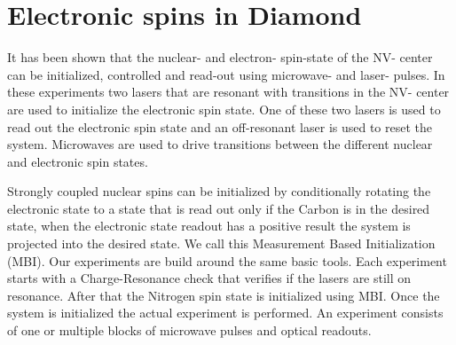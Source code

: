 \chapter{Electronic spins in Diamond}
\label{controlingspinsindiamond}




It has been shown that the nuclear- and electron- spin-state of the NV- center can be initialized, controlled and read-out using microwave- and laser- pulses\citep{Robledo2011HighFidelity}. In these experiments two lasers that are resonant with transitions in the NV- center are used to initialize the electronic spin state.
One of these two lasers is used to read out the electronic spin state and an off-resonant laser is used to reset the system. Microwaves are used to drive transitions between the different nuclear and electronic spin states.

Strongly coupled nuclear spins can be initialized by conditionally rotating the electronic state to a state that is read out only if the Carbon is in the desired state, when the electronic state readout has a positive result the system is projected into the desired state. We call this Measurement Based Initialization (MBI).
%
%
%
%
%
%
Our experiments are build around the same basic tools.
Each experiment starts with a Charge-Resonance check that verifies if the lasers are still on resonance.
After that the Nitrogen spin state is initialized using MBI.
Once the system is initialized the actual experiment is performed.
An experiment consists of one or multiple blocks of microwave pulses and optical readouts.

